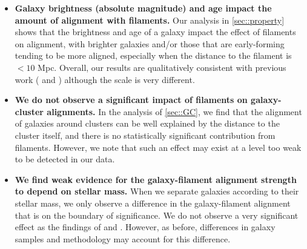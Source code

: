 \documentclass[usenatbib,useAMS]{mnras}
\theoremstyle{remark}
\begin{document}
{{{\begin{itemize}
\item {\bf Galaxy brightness (absolute magnitude) and age impact the amount of alignment with filaments.}
Our analysis in \autoref{sec::property}
shows that the brightness and age of a galaxy impact the effect of filaments on alignment, with
brighter galaxies and/or those that are early-forming tending to be more aligned, especially when
the distance to the filament is $<10$ Mpc.
Overall, our results are qualitatively consistent with previous work (\citealt{2015MNRAS.450.2727T}
and \citealt{2013ApJ...779..160Z}) { although the scale is very different}. 

\item {\bf We do not observe a significant impact of filaments on galaxy-cluster alignments.}
In the analysis of \autoref{sec::GC}, we find that the alignment of galaxies around clusters can be well explained by
the distance to the cluster itself, and there is no statistically significant contribution from filaments. 
However, we note that such an effect may exist at a level too weak to be detected in our data.


\item {\bf We find weak evidence for the galaxy-filament alignment strength to depend on stellar mass.}
When we separate galaxies according to their stellar mass, 
we only observe a difference in the galaxy-filament alignment that is on
the boundary of significance. 
We do not observe a very significant effect
as the 
%
findings of \cite{2009ApJ...706..747Z} and \cite{2015MNRAS.454.3341C}.
However, as before, differences in galaxy samples and methodology may account for this difference. 


\end{itemize}}}}
\end{document}
